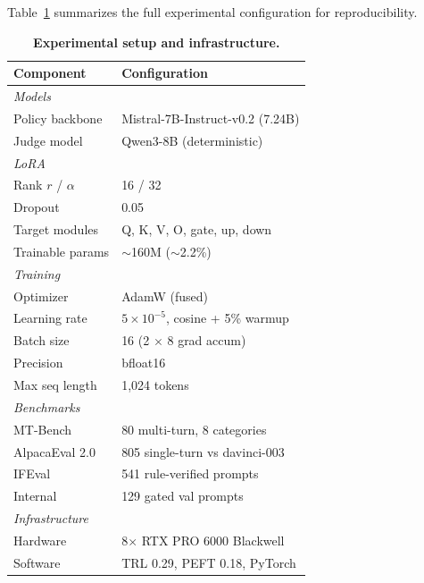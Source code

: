 \documentclass[10pt,twocolumn]{article}
\begin{document}
Table~\ref{tab:setup} summarizes the full experimental configuration for reproducibility.

\begin{table}[t]
\centering
\caption{\textbf{Experimental setup and infrastructure.}}
\label{tab:setup}
\vspace{0.5em}
\small
\begin{tabular}{l l}
\toprule
\textbf{Component} & \textbf{Configuration} \\
\midrule
\multicolumn{2}{l}{\textit{Models}} \\
\quad Policy backbone    & Mistral-7B-Instruct-v0.2 (7.24B) \\
\quad Judge model        & Qwen3-8B (deterministic) \\
\midrule
\multicolumn{2}{l}{\textit{LoRA}} \\
\quad Rank $r$ / $\alpha$ & 16 / 32 \\
\quad Dropout            & 0.05 \\
\quad Target modules     & Q, K, V, O, gate, up, down \\
\quad Trainable params   & $\sim$160M ($\sim$2.2\%) \\
\midrule
\multicolumn{2}{l}{\textit{Training}} \\
\quad Optimizer          & AdamW (fused) \\
\quad Learning rate      & $5 \times 10^{-5}$, cosine + 5\% warmup \\
\quad Batch size         & 16 (2 $\times$ 8 grad accum) \\
\quad Precision          & bfloat16 \\
\quad Max seq length     & 1{,}024 tokens \\
\midrule
\multicolumn{2}{l}{\textit{Benchmarks}} \\
\quad MT-Bench           & 80 multi-turn, 8 categories \\
\quad AlpacaEval 2.0     & 805 single-turn vs davinci-003 \\
\quad IFEval             & 541 rule-verified prompts \\
\quad Internal           & 129 gated val prompts \\
\midrule
\multicolumn{2}{l}{\textit{Infrastructure}} \\
\quad Hardware           & 8$\times$ RTX PRO 6000 Blackwell \\
\quad Software           & TRL 0.29, PEFT 0.18, PyTorch \\
\bottomrule
\end{tabular}
\end{table}
\end{document}
